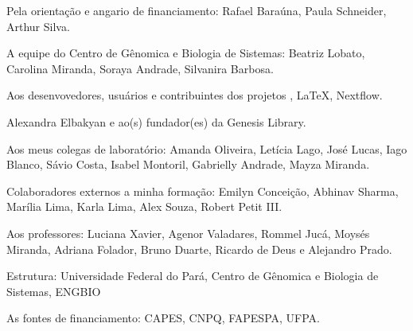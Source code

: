 \begin{agradecimentos}
Pela orientação e angario de financiamento: Rafael Baraúna, Paula Schneider, Arthur Silva. 

A equipe do Centro de Gênomica e Biologia de Sistemas: Beatriz Lobato, Carolina Miranda, Soraya Andrade,
Silvanira Barbosa. 

Aos desenvovedores, usuários e contribuintes dos projetos \abnTeX, \LaTeX, Nextflow.

Alexandra Elbakyan e ao(s) fundador(es) da Genesis Library.



Aos meus colegas de laboratório: Amanda Oliveira, Letícia Lago, José Lucas, Iago Blanco, 
Sávio Costa, Isabel Montoril, Gabrielly Andrade, Mayza Miranda. 

Colaboradores externos a minha formação: Emilyn Conceição, Abhinav Sharma, Marília Lima, Karla Lima, Alex Souza, Robert Petit III.

Aos professores: Luciana Xavier, Agenor Valadares, Rommel Jucá, Moysés Miranda, Adriana Folador,
Bruno Duarte, Ricardo de Deus e Alejandro Prado.

Estrutura: Universidade Federal do Pará, Centro de Gênomica e Biologia de Sistemas, ENGBIO

As fontes de financiamento: CAPES, CNPQ, FAPESPA, UFPA.

\end{agradecimentos}
